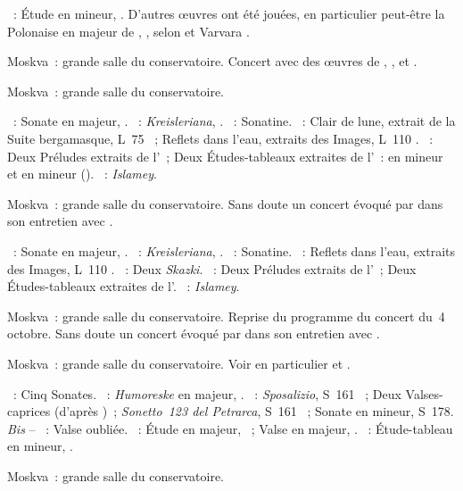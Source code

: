 \begin{description}
 \textsc{\Scriabine{}}~: Étude en \kD \Sharp mineur,  .
 D'autres œuvres ont été jouées, en particulier peut-être la Polonaise en
 \kA \Flat majeur de \Chopin{}, , selon \INikonovich{}
 \citep[voir][p.~54, note~7]{White} et Varvara \citet[p.~166]{Nekrasova08}.
 \item[\DateWithWeekDay{1945-09-20}]
 Moskva~: grande salle du conservatoire.
 Concert avec des œuvres de \Beethoven{}, \Schumann{}, \Ravel{} et
 \Debussy{}.
 \item[\DateWithWeekDay{1945-09-26}]
 Moskva~: grande salle du conservatoire.

 \textsc{\Beethoven{}}~: Sonate en \kE \Flat majeur, .
 \textsc{\Schumann{}}~: \emph{Kreisleriana}, .
 \textsc{\Ravel{}}~: Sonatine.
 \textsc{\Debussy{}}~: Clair de lune, extrait de la Suite bergamasque, L~75
 ~; Reflets dans l'eau, extraits des Images, L~110 .
 \textsc{\Rachmaninov{}}~: Deux Préludes extraits de l'~; Deux
 Études-tableaux extraites de l'~: en \kA mineur et en \kB mineur
 ().
 \textsc{\Balakirev{}}~: \emph{Islamey}.
 \item[\DateWithWeekDay{1945-10-04}]
 Moskva~: grande salle du conservatoire.
 Sans doute un concert évoqué par \VSofronitsky{} dans son entretien avec
 \citet{Vitsinsky}.

 \textsc{\Beethoven{}}~: Sonate en \kE \Flat majeur, .
 \textsc{\Schumann{}}~: \emph{Kreisleriana}, .
 \textsc{\Ravel{}}~: Sonatine.
 \textsc{\Debussy{}}~: Reflets dans l'eau, extraits des Images, L~110
 .
 \textsc{\Medtner{}}~: Deux \emph{Skazki}.
 \textsc{\Rachmaninov{}}~: Deux Préludes extraits de l'~; Deux
 Études-tableaux extraites de l'.
 \textsc{\Balakirev{}}~: \emph{Islamey}.
 \item[\DateWithWeekDay{1945-10-22}]
 Moskva~: grande salle du conservatoire.
 Reprise du programme du concert du~4 octobre.
 Sans doute un concert évoqué par \VSofronitsky{} dans son entretien avec
 \citet{Vitsinsky}.
 \item[\DateWithWeekDay{1945-11-12}]
 Moskva~: grande salle du conservatoire.
 Voir en particulier \citet[p.~442]{Milshteyn82a} et
 \citet[p.~394]{Nikonovich08}.

 \textsc{\Scarlatti{}}~: Cinq Sonates.
 \textsc{\Schumann{}}~: \emph{Humoreske} en \kB \Flat majeur, .
 \textsc{\Liszt{}}~: \emph{Sposalizio}, S~161 ~; Deux
 Valses-caprices (d'après \Schubert{})~; \emph{Sonetto~123 del Petrarca},
 S~161 ~; Sonate en \kB mineur, S~178.
 \emph{Bis} -- \textsc{\Liszt{}}~: Valse oubliée.
 \textsc{\Chopin{}}~: Étude en \kG \Flat majeur,  ~;
 Valse  en \kA \Flat majeur,  .
 \textsc{\Rachmaninov{}}~: Étude-tableau en \kA mineur, 
 .
 \item[\DateWithWeekDay{1945-12-12}]
 Moskva~: grande salle du conservatoire.


\end{description}
